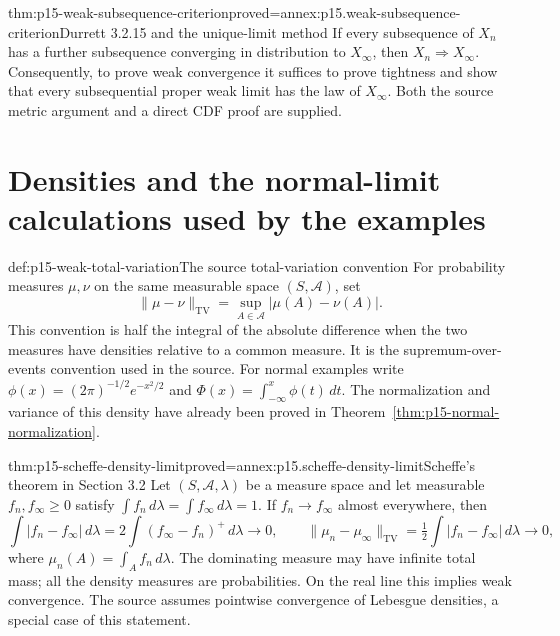 \begin{hbtheorem}{thm:p15-weak-subsequence-criterion}{proved=annex:p15.weak-subsequence-criterion}{Durrett 3.2.15 and the unique-limit method}
If every subsequence of \(X_n\) has a further subsequence
converging in distribution to \(X_\infty\), then
\(X_n\Rightarrow X_\infty\). Consequently, to prove weak
convergence it suffices to prove tightness and show that every
subsequential proper weak limit has the law of \(X_\infty\).
Both the source metric argument and a direct CDF proof are supplied.
\end{hbtheorem}

\section{Densities and the normal-limit calculations used by the examples}
\label{sec:p15-weak-density-examples}

\begin{hbdefinition}{def:p15-weak-total-variation}{The source total-variation convention}
For probability measures \(\mu,\nu\) on the same measurable
space \((S,\mathcal A)\), set
\[
 \|\mu-\nu\|_{\mathrm{TV}}
       =\sup_{A\in\mathcal A}|\mu(A)-\nu(A)|.
\]
This convention is half the integral of the absolute difference
when the two measures have densities relative to a common measure.
It is the supremum-over-events convention used in the source.
For normal examples write
\(\phi(x)=(2\pi)^{-1/2}e^{-x^2/2}\) and
\(\Phi(x)=\int_{-\infty}^x\phi(t)\,dt\).
The normalization and variance of this density have already been
proved in Theorem~\ref{thm:p15-normal-normalization}.
\end{hbdefinition}

\begin{hbtheorem}{thm:p15-scheffe-density-limit}{proved=annex:p15.scheffe-density-limit}{Scheffe's theorem in Section 3.2}
Let \((S,\mathcal A,\lambda)\) be a measure space and let
measurable \(f_n,f_\infty\geq0\) satisfy
\(\int f_n\,d\lambda=\int f_\infty\,d\lambda=1\).
If \(f_n\to f_\infty\) almost everywhere, then
\[
 \int|f_n-f_\infty|\,d\lambda
 =2\int(f_\infty-f_n)^+\,d\lambda\longrightarrow0,\qquad
 \|\mu_n-\mu_\infty\|_{\mathrm{TV}}
       =\tfrac12\int|f_n-f_\infty|\,d\lambda\longrightarrow0,
\]
where \(\mu_n(A)=\int_A f_n\,d\lambda\).
The dominating measure may have infinite total mass; all the
density measures are probabilities. On the real line this
implies weak convergence. The source assumes pointwise
convergence of Lebesgue densities, a special case of this statement.
\end{hbtheorem}

